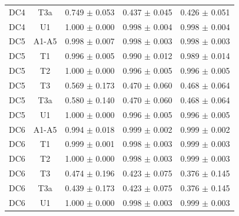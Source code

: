 \begin{tabular}{lcccc}
DC4 & T3a & 0.749 $\pm$ 0.053 & 0.437 $\pm$ 0.045 & 0.426 $\pm$ 0.051 \\
DC4 & U1 & 1.000 $\pm$ 0.000 & 0.998 $\pm$ 0.004 & 0.998 $\pm$ 0.004 \\
DC5 & A1-A5 & 0.998 $\pm$ 0.007 & 0.998 $\pm$ 0.003 & 0.998 $\pm$ 0.003 \\
DC5 & T1 & 0.996 $\pm$ 0.005 & 0.990 $\pm$ 0.012 & 0.989 $\pm$ 0.014 \\
DC5 & T2 & 1.000 $\pm$ 0.000 & 0.996 $\pm$ 0.005 & 0.996 $\pm$ 0.005 \\
DC5 & T3 & 0.569 $\pm$ 0.173 & 0.470 $\pm$ 0.060 & 0.468 $\pm$ 0.064 \\
DC5 & T3a & 0.580 $\pm$ 0.140 & 0.470 $\pm$ 0.060 & 0.468 $\pm$ 0.064 \\
DC5 & U1 & 1.000 $\pm$ 0.000 & 0.996 $\pm$ 0.005 & 0.996 $\pm$ 0.005 \\
DC6 & A1-A5 & 0.994 $\pm$ 0.018 & 0.999 $\pm$ 0.002 & 0.999 $\pm$ 0.002 \\
DC6 & T1 & 0.999 $\pm$ 0.001 & 0.998 $\pm$ 0.003 & 0.999 $\pm$ 0.003 \\
DC6 & T2 & 1.000 $\pm$ 0.000 & 0.998 $\pm$ 0.003 & 0.999 $\pm$ 0.003 \\
DC6 & T3 & 0.474 $\pm$ 0.196 & 0.423 $\pm$ 0.075 & 0.376 $\pm$ 0.145 \\
DC6 & T3a & 0.439 $\pm$ 0.173 & 0.423 $\pm$ 0.075 & 0.376 $\pm$ 0.145 \\
DC6 & U1 & 1.000 $\pm$ 0.000 & 0.998 $\pm$ 0.003 & 0.999 $\pm$ 0.003 \\
\hline
\end{tabular}
